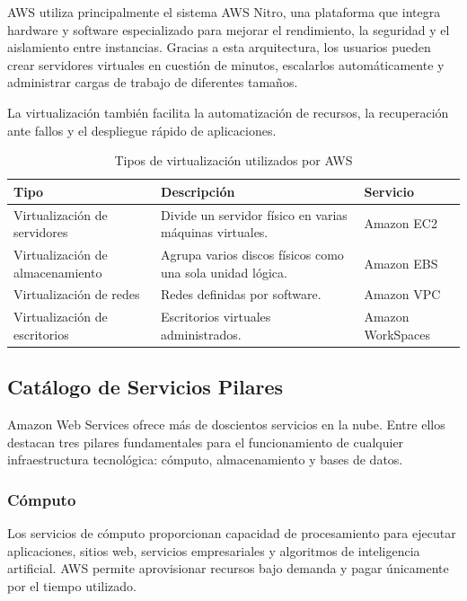 \documentclass[12pt,a4paper]{article}
\begin{document}
AWS utiliza principalmente el sistema AWS Nitro, una plataforma que integra hardware y software especializado para mejorar el rendimiento, la seguridad y el aislamiento entre instancias. Gracias a esta arquitectura, los usuarios pueden crear servidores virtuales en cuestión de minutos, escalarlos automáticamente y administrar cargas de trabajo de diferentes tamaños\parencite{awsNitro}.

La virtualización también facilita la automatización de recursos, la recuperación ante fallos y el despliegue rápido de aplicaciones.

\begin{table}[H]
\centering
\caption{Tipos de virtualización utilizados por AWS}
\begin{tabularx}{\textwidth}{lXX}
\toprule
\textbf{Tipo} & \textbf{Descripción} & \textbf{Servicio}\\
\midrule
Virtualización de servidores & Divide un servidor físico en varias máquinas virtuales. & Amazon EC2\\

Virtualización de almacenamiento & Agrupa varios discos físicos como una sola unidad lógica. & Amazon EBS\\

Virtualización de redes & Redes definidas por software. & Amazon VPC\\

Virtualización de escritorios & Escritorios virtuales administrados. & Amazon WorkSpaces\\
\bottomrule
\end{tabularx}
\end{table}

\subsection{Catálogo de Servicios Pilares}

Amazon Web Services ofrece más de doscientos servicios en la nube. Entre ellos destacan tres pilares fundamentales para el funcionamiento de cualquier infraestructura tecnológica: cómputo, almacenamiento y bases de datos.

\subsubsection{Cómputo}

Los servicios de cómputo proporcionan capacidad de procesamiento para ejecutar aplicaciones, sitios web, servicios empresariales y algoritmos de inteligencia artificial. AWS permite aprovisionar recursos bajo demanda y pagar únicamente por el tiempo utilizado\parencite{amazonEC2}.
\end{document}
